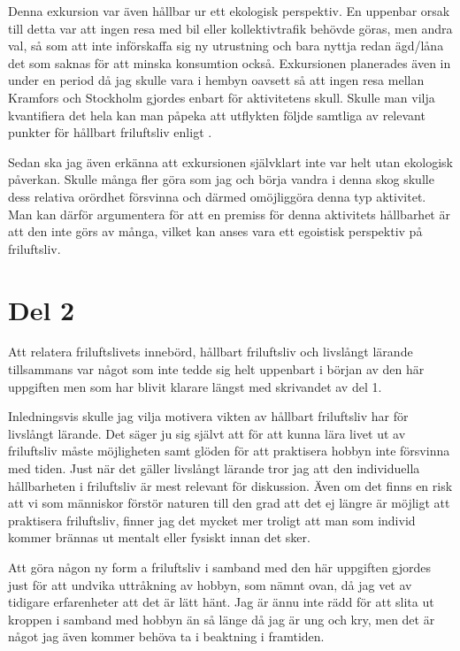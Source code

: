 \documentclass[12pt]{article}   %
\begin{document}
Denna exkursion var även hållbar ur ett ekologisk perspektiv. En uppenbar orsak till detta var
att ingen resa med bil eller kollektivtrafik behövde göras, men andra val, så som att inte
införskaffa sig ny utrustning och bara nyttja redan ägd/låna det som saknas för att minska
konsumtion också. Exkursionen planerades även in under en period då jag skulle vara i hembyn
oavsett så att ingen resa mellan Kramfors och Stockholm gjordes enbart för aktivitetens skull.
Skulle man vilja kvantifiera det hela kan man påpeka att utflykten följde samtliga av
relevant punkter för hållbart friluftsliv enligt \cite{checklista}.

Sedan ska jag även erkänna att exkursionen självklart inte var helt utan ekologisk påverkan.
Skulle många fler göra som jag och börja vandra i denna skog skulle dess relativa orördhet
försvinna och därmed omöjliggöra denna typ aktivitet. Man kan därför argumentera för att en premiss
för denna aktivitets hållbarhet är att den inte görs av många, vilket kan anses vara ett egoistisk
perspektiv på friluftsliv.

\section*{Del 2}

Att relatera friluftslivets innebörd, hållbart friluftsliv och livslångt lärande tillsammans var
något som inte tedde sig helt uppenbart i början av den här uppgiften men som har blivit klarare
längst med skrivandet av del 1.

Inledningsvis skulle jag vilja motivera vikten av hållbart friluftsliv har för livslångt lärande.
Det säger ju sig självt att för att kunna lära livet ut av friluftsliv måste möjligheten samt
glöden för att praktisera hobbyn inte försvinna med tiden. Just när det gäller livslångt
lärande tror jag att den individuella hållbarheten i friluftsliv är mest relevant för diskussion.
Även om det finns en risk att vi som människor förstör naturen till den grad att det ej längre
är möjligt att praktisera friluftsliv, finner jag det mycket mer troligt att man som individ
kommer brännas ut mentalt eller fysiskt innan det sker.

Att göra någon ny form a friluftsliv
i samband med den här uppgiften gjordes just för att undvika uttråkning av hobbyn, som nämnt
ovan, då jag vet av tidigare erfarenheter att det är lätt hänt. Jag är ännu inte rädd för att slita
ut kroppen i samband med hobbyn än så länge då jag är ung och kry, men det är något jag även
kommer behöva ta i beaktning i framtiden.
\end{document}
